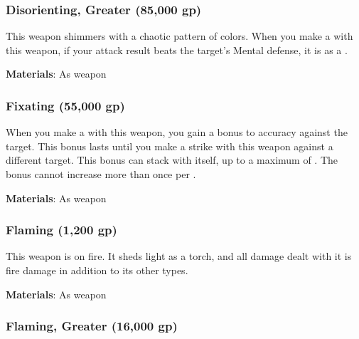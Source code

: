 \lowercase{\hypertarget{item:Disorienting, Greater}{}}\label{item:Disorienting, Greater}
\hypertarget{item:Disorienting, Greater}{\subsubsection{Disorienting, Greater\hfill{} (85,000 gp)}}

This weapon shimmers with a chaotic pattern of colors.
When you make a  with this weapon, if your attack result beats the target's Mental defense, it is \disoriented as a .



\vspace{0.25em}
\textbf{Materials}: As weapon


\lowercase{\hypertarget{item:Fixating}{}}\label{item:Fixating}
\hypertarget{item:Fixating}{\subsubsection{Fixating\hfill{} (55,000 gp)}}

When you make a  with this weapon, you gain a  bonus to accuracy against the target.
This bonus lasts until you make a strike with this weapon against a different target.
This bonus can stack with itself, up to a maximum of .
The bonus cannot increase more than once per .



\vspace{0.25em}
\textbf{Materials}: As weapon


\lowercase{\hypertarget{item:Flaming}{}}\label{item:Flaming}
\hypertarget{item:Flaming}{\subsubsection{Flaming\hfill{} (1,200 gp)}}

This weapon is on fire.
It sheds light as a torch, and all damage dealt with it is fire damage in addition to its other types.



\vspace{0.25em}
\textbf{Materials}: As weapon


\lowercase{\hypertarget{item:Flaming, Greater}{}}\label{item:Flaming, Greater}
\hypertarget{item:Flaming, Greater}{\subsubsection{Flaming, Greater\hfill{} (16,000 gp)}}


